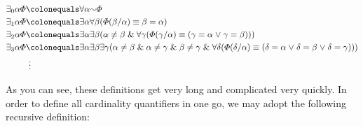 \vspace{-.2in}
\begin{align*}
  \qt{\exists_0}{\alpha}\metaA &\colonequals \qt{\forall}{\alpha}\enot\metaA\\
  \qt{\exists_1}{\alpha}\metaA &\colonequals \qt{\exists}{\alpha}\qt{\forall}{\beta}(\metaA(\beta/\alpha) \eiff \beta = \alpha)\\ 
  \qt{\exists_2}{\alpha}\metaA &\colonequals \qt{\exists}{\alpha}\qt{\exists}{\beta}(\alpha\neq\beta \eand \qt{\forall}{\gamma}(\metaA(\gamma/\alpha) \eiff (\gamma = \alpha \eor \gamma = \beta)))\\
  \qt{\exists_3}{\alpha}\metaA &\colonequals \qt{\exists}{\alpha}
      \qt{\exists}{\beta}
        \qt{\exists}{\gamma}(
          \alpha\neq\beta \eand \alpha\neq\gamma \eand \beta\neq\gamma \eand \qt{\forall}{\delta}(
            \metaA(\delta/\alpha) \eiff (
              \delta = \alpha \eor \delta = \beta \eor \delta = \gamma
            )
          )
        )\\
  & ~\vdots
\end{align*}

As you can see, these definitions get very long and complicated very quickly.
In order to define all cardinality quantifiers in one go, we may adopt the following recursive definition:

